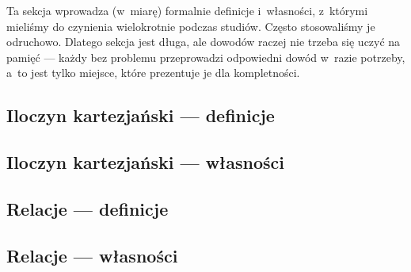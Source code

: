 Ta sekcja wprowadza (w~miarę) formalnie definicje i~własności, z~którymi mieliśmy do czynienia wielokrotnie podczas studiów. Często stosowaliśmy je odruchowo. Dlatego sekcja jest długa, ale dowodów raczej nie trzeba się uczyć na pamięć --- każdy bez problemu przeprowadzi odpowiedni dowód w~razie potrzeby, a~to jest tylko miejsce, które prezentuje je dla kompletności.
\subsection{Iloczyn kartezjański --- definicje}
\label{mfi:cartesian_and_relations:cartesian_definitions}


\subsection{Iloczyn kartezjański --- własności}
\label{mfi:cartesian_and_relations:cartesian_properties}


\subsection{Relacje --- definicje}

\label{mfi:cartesian_and_relations:relation_definitions}

\subsection{Relacje --- własności}

\label{mfi:cartesian_and_relations:relation_properties}
